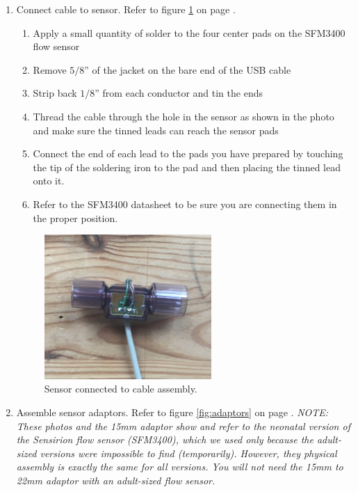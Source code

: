 \documentclass[11pt, letterpaper]{article}
\begin{document}
\begin{enumerate}
\begin{enumerate}[label=4.\arabic*]
\item
Connect cable to sensor.  Refer to figure \ref{fig:flow_sensor} on page \pageref{fig:flow_sensor}.

\begin{enumerate}[label=4.2.\arabic*]
\item
Apply a small quantity of solder to the four center pads on the SFM3400 flow sensor
\item
Remove $5/8$'' of the jacket on the bare end of the USB cable
\item
Strip back $1/8$'' from each conductor and tin the ends
\item
Thread the cable through the hole in the sensor as shown in the photo and make sure the tinned leads can reach the sensor pads
\item
Connect the end of each lead to the pads you have prepared by touching the tip of the soldering iron to the pad and then placing the tinned lead onto it.
\item
Refer to the SFM3400 datasheet to be sure you are connecting them in the proper position.
\end{enumerate}
\begin{figure}[H]
\label{fig:flow_sensor}
\centering
\includegraphics[width=0.6\textwidth]{images/flow_cable.JPG}
\caption{Sensor connected to cable assembly.}
\end{figure}

\item
  Assemble sensor adaptors. Refer to figure \ref{fig:adaptors} on page \pageref{fig:adaptors}.
  {\em NOTE: These photos and the 15mm adaptor show and refer to the neonatal version of the Sensirion flow sensor (SFM3400),
    which we used only because the adult-sized versions were impossible to find (temporarily). However, they physical
    assembly is exactly the same for all versions. You will not need the 15mm to 22mm adaptor with an adult-sized flow sensor.}


\end{enumerate}
\end{enumerate}
\end{document}
